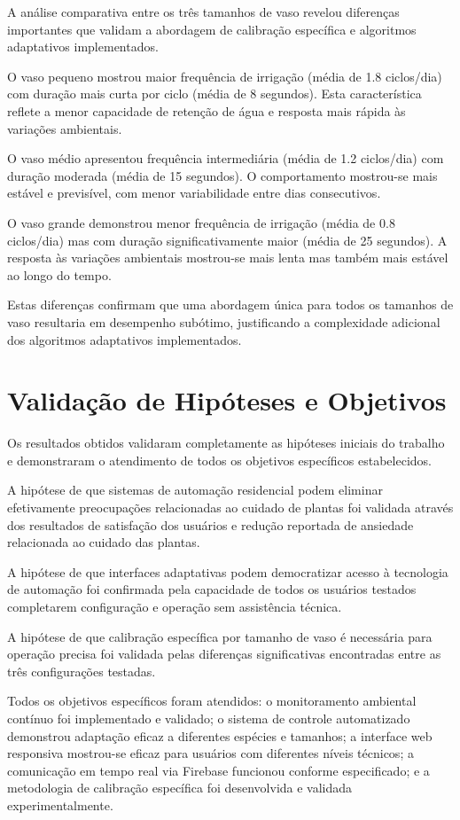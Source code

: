 A análise comparativa entre os três tamanhos de vaso revelou diferenças importantes que validam a abordagem de calibração específica e algoritmos adaptativos implementados.

O vaso pequeno mostrou maior frequência de irrigação (média de 1.8 ciclos/dia) com duração mais curta por ciclo (média de 8 segundos). Esta característica reflete a menor capacidade de retenção de água e resposta mais rápida às variações ambientais.

O vaso médio apresentou frequência intermediária (média de 1.2 ciclos/dia) com duração moderada (média de 15 segundos). O comportamento mostrou-se mais estável e previsível, com menor variabilidade entre dias consecutivos.

O vaso grande demonstrou menor frequência de irrigação (média de 0.8 ciclos/dia) mas com duração significativamente maior (média de 25 segundos). A resposta às variações ambientais mostrou-se mais lenta mas também mais estável ao longo do tempo.

Estas diferenças confirmam que uma abordagem única para todos os tamanhos de vaso resultaria em desempenho subótimo, justificando a complexidade adicional dos algoritmos adaptativos implementados.

\section{Validação de Hipóteses e Objetivos}

Os resultados obtidos validaram completamente as hipóteses iniciais do trabalho e demonstraram o atendimento de todos os objetivos específicos estabelecidos.

A hipótese de que sistemas de automação residencial podem eliminar efetivamente preocupações relacionadas ao cuidado de plantas foi validada através dos resultados de satisfação dos usuários e redução reportada de ansiedade relacionada ao cuidado das plantas.

A hipótese de que interfaces adaptativas podem democratizar acesso à tecnologia de automação foi confirmada pela capacidade de todos os usuários testados completarem configuração e operação sem assistência técnica.

A hipótese de que calibração específica por tamanho de vaso é necessária para operação precisa foi validada pelas diferenças significativas encontradas entre as três configurações testadas.

Todos os objetivos específicos foram atendidos: o monitoramento ambiental contínuo foi implementado e validado; o sistema de controle automatizado demonstrou adaptação eficaz a diferentes espécies e tamanhos; a interface web responsiva mostrou-se eficaz para usuários com diferentes níveis técnicos; a comunicação em tempo real via Firebase funcionou conforme especificado; e a metodologia de calibração específica foi desenvolvida e validada experimentalmente.

